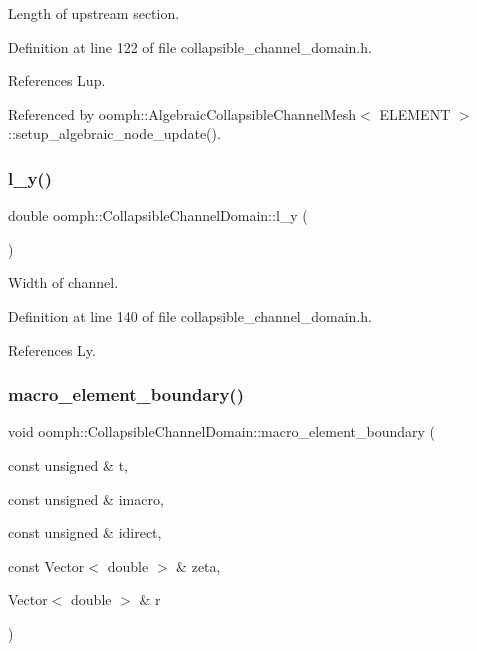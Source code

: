 Length of upstream section. 



Definition at line 122 of file collapsible\+\_\+channel\+\_\+domain.\+h.



References Lup.



Referenced by oomph\+::\+Algebraic\+Collapsible\+Channel\+Mesh$<$ E\+L\+E\+M\+E\+N\+T $>$\+::setup\+\_\+algebraic\+\_\+node\+\_\+update().

\mbox{\label{classoomph_1_1CollapsibleChannelDomain_ab95f48218b922883be6c8b9bfb39c2a8}} 
\subsubsection{\texorpdfstring{l\+\_\+y()}{l\_y()}}
{\footnotesize\ttfamily double oomph\+::\+Collapsible\+Channel\+Domain\+::l\+\_\+y (\begin{DoxyParamCaption}{ }\end{DoxyParamCaption})\hspace{0.3cm}{\ttfamily [inline]}}



Width of channel. 



Definition at line 140 of file collapsible\+\_\+channel\+\_\+domain.\+h.



References Ly.

\mbox{\label{classoomph_1_1CollapsibleChannelDomain_a2c0a5bd21e12fbcc1cdd753c0f205da2}} 
\subsubsection{\texorpdfstring{macro\+\_\+element\+\_\+boundary()}{macro\_element\_boundary()}}
{\footnotesize\ttfamily void oomph\+::\+Collapsible\+Channel\+Domain\+::macro\+\_\+element\+\_\+boundary (\begin{DoxyParamCaption}\item[{const unsigned \&}]{t,  }\item[{const unsigned \&}]{imacro,  }\item[{const unsigned \&}]{idirect,  }\item[{const Vector$<$ double $>$ \&}]{zeta,  }\item[{Vector$<$ double $>$ \&}]{r }\end{DoxyParamCaption})}



